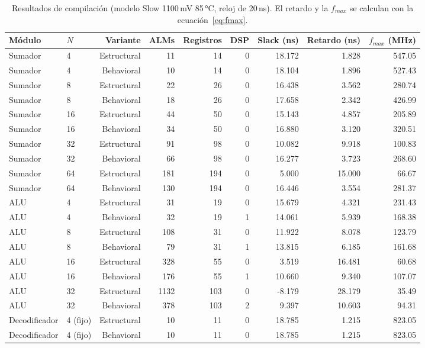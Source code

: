 \documentclass[11pt,letterpaper]{article}
\begin{document}
\begin{table}[H]
\centering
\caption{Resultados de compilación (modelo Slow 1100\,mV 85\,°C, reloj de 20\,ns). El retardo
y la $f_{max}$ se calculan con la ecuación~\eqref{eq:fmax}.}
\label{tab:resultados}
\small
\setlength{\tabcolsep}{4pt}
\begin{tabular}{llrrrrrrr}
\toprule
Módulo & $N$ & Variante & ALMs & Registros & DSP & Slack (ns) & Retardo (ns) & $f_{max}$ (MHz) \\
\midrule
Sumador & 4 & Estructural & 11 & 14 & 0 & 18.172 & 1.828 & 547.05 \\
Sumador & 4 & Behavioral & 10 & 14 & 0 & 18.104 & 1.896 & 527.43 \\
Sumador & 8 & Estructural & 22 & 26 & 0 & 16.438 & 3.562 & 280.74 \\
Sumador & 8 & Behavioral & 18 & 26 & 0 & 17.658 & 2.342 & 426.99 \\
Sumador & 16 & Estructural & 44 & 50 & 0 & 15.143 & 4.857 & 205.89 \\
Sumador & 16 & Behavioral & 34 & 50 & 0 & 16.880 & 3.120 & 320.51 \\
Sumador & 32 & Estructural & 91 & 98 & 0 & 10.082 & 9.918 & 100.83 \\
Sumador & 32 & Behavioral & 66 & 98 & 0 & 16.277 & 3.723 & 268.60 \\
Sumador & 64 & Estructural & 181 & 194 & 0 & 5.000 & 15.000 & 66.67 \\
Sumador & 64 & Behavioral & 130 & 194 & 0 & 16.446 & 3.554 & 281.37 \\
\midrule
ALU & 4 & Estructural & 31 & 19 & 0 & 15.679 & 4.321 & 231.43 \\
ALU & 4 & Behavioral & 32 & 19 & 1 & 14.061 & 5.939 & 168.38 \\
ALU & 8 & Estructural & 108 & 31 & 0 & 11.922 & 8.078 & 123.79 \\
ALU & 8 & Behavioral & 79 & 31 & 1 & 13.815 & 6.185 & 161.68 \\
ALU & 16 & Estructural & 328 & 55 & 0 & 3.519 & 16.481 & 60.68 \\
ALU & 16 & Behavioral & 176 & 55 & 1 & 10.660 & 9.340 & 107.07 \\
ALU & 32 & Estructural & 1132 & 103 & 0 & -8.179 & 28.179 & 35.49 \\
ALU & 32 & Behavioral & 378 & 103 & 2 & 9.397 & 10.603 & 94.31 \\
\midrule
Decodificador & 4 (fijo) & Estructural & 10 & 11 & 0 & 18.785 & 1.215 & 823.05 \\
Decodificador & 4 (fijo) & Behavioral & 10 & 11 & 0 & 18.785 & 1.215 & 823.05 \\
\bottomrule
\end{tabular}
\end{table}
\end{document}
